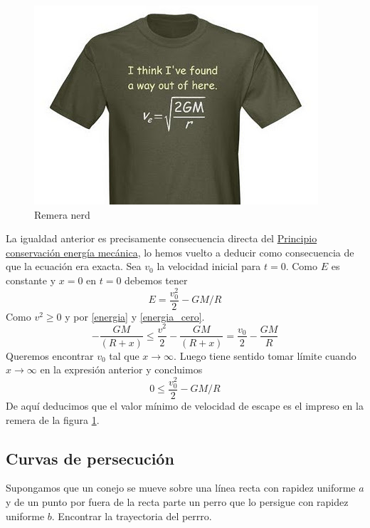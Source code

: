 \begin{figure}
\begin{center}
 \includegraphics[scale=.3]{imagenes/velocidad_escape.jpg}
\end{center}
\caption{Remera nerd}\label{fig:vel_escape}
\end{figure}
La igualdad anterior es precisamente  consecuencia directa del \href{https://docs.google.com/file/d/0B80iJ0HgObRRWll6MlJFSjFNMGc/edit}{Principio conservación energía mecánica}, lo hemos vuelto a deducir como consecuencia de que la ecuación era exacta.  Sea $v_0$ la velocidad inicial para $t=0$. Como $E$ es constante y $x=0$ en $t=0$ debemos tener
\begin{equation}\label{energia_cero}
 E=\frac{v_0^2}{2}-GM/R
\end{equation}
Como $v^2\geq 0$ y por \eqref{energia} y \eqref{energia_cero}.
\[-\frac{GM}{(R+x)}\leq\frac{v^2}{2}-\frac{GM}{(R+x)}=\frac{v_0}{2}-\frac{GM}{R}\]
Queremos encontrar $v_0$ tal que $x\to\infty$. Luego tiene sentido tomar límite cuando $x\to\infty$ en la expresión anterior y concluimos
\[0\leq \frac{v_0^2}{2}-GM/R\]
De aquí deducimos que el valor mínimo de velocidad de escape es el impreso en la remera de la figura \ref{fig:vel_escape}.

\subsection{Curvas de persecución}

\begin{problema} Supongamos que un conejo se mueve sobre una
línea recta con rapidez uniforme $a$ y de un punto por fuera de la recta parte un perro que lo
persigue con rapidez uniforme $b$. Encontrar la trayectoria del perrro.
\end{problema}

